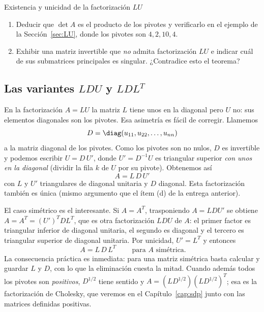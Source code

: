 \begin{entrega}{Existencia y unicidad de la factorización $LU$}
\begin{enumerate}[label=\textbf{(\alph*)},itemsep=3pt,topsep=4pt]
\item Deducir que $\det A$ es el producto de los pivotes y verificarlo en el
ejemplo de la Sección~\ref{sec:LU}, donde los pivotes son $4,2,10,4$.

\item Exhibir una matriz invertible que \emph{no} admita factorización $LU$ e
indicar cuál de sus submatrices principales es singular. ¿Contradice esto el
teorema?
\end{enumerate}

\medskip
{}
\end{entrega}

\subsection{Las variantes $LDU$ y $LDL^T$}\label{sec:LDU}

En la factorización $A=LU$ la matriz $L$ tiene unos en la diagonal pero $U$ no:
sus elementos diagonales son los pivotes. Esa asimetría es fácil de corregir.
Llamemos
\[
D = \diag(u_{11},u_{22},\dots,u_{nn})
\]
a la matriz diagonal de los pivotes. Como los pivotes son no nulos, $D$ es
invertible y podemos escribir $U = D\,U'$, donde $U' = D^{-1}U$ es triangular
superior \emph{con unos en la diagonal} (dividir la fila $k$ de $U$ por su
pivote). Obtenemos así
\[
\boxed{\ A = L\,D\,U'\ }
\]
con $L$ y $U'$ triangulares de diagonal unitaria y $D$ diagonal. Esta
factorización también es única (mismo argumento que el ítem (d) de la entrega
anterior).

El caso simétrico es el interesante. Si $A = A^T$, trasponiendo $A=LDU'$ se
obtiene $A = A^T = (U')^T D L^T$, que es otra factorización $LDU$ de $A$: el
primer factor es triangular inferior de diagonal unitaria, el segundo es
diagonal y el tercero es triangular superior de diagonal unitaria. Por unicidad,
$U' = L^T$ y entonces
\[
\boxed{\ A = L\,D\,L^T\ }\qquad\text{para } A \text{ simétrica.}
\]
La consecuencia práctica es inmediata: para una matriz simétrica basta calcular
y guardar $L$ y $D$, con lo que la eliminación cuesta la mitad. Cuando además
todos los pivotes son \emph{positivos}, $D^{1/2}$ tiene sentido y
$A = (LD^{1/2})(LD^{1/2})^T$; esa es la factorización de Cholesky, que veremos
en el Capítulo~\ref{cap:sdp} junto con las matrices definidas positivas.

